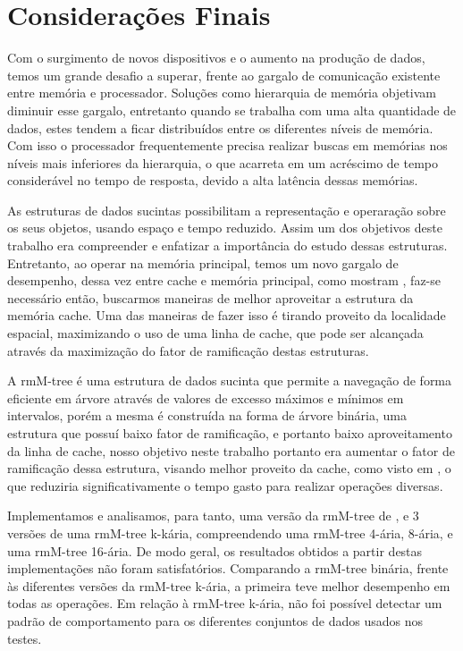 \chapter{Considerações Finais}\label{chp:conclusao}

Com o surgimento de novos dispositivos e o aumento na produção de dados, temos um grande desafio a superar, frente ao gargalo de comunicação existente entre memória e processador. Soluções como hierarquia de memória objetivam diminuir esse gargalo, entretanto quando se trabalha com uma alta quantidade de dados, estes tendem a ficar distribuídos entre os diferentes níveis de memória. Com isso o processador frequentemente precisa realizar buscas em memórias  nos níveis mais inferiores da hierarquia, o que acarreta em um acréscimo de tempo considerável no tempo de resposta, devido a alta latência dessas memórias.

As estruturas de dados sucintas possibilitam a representação e operaração sobre os seus objetos, usando espaço e tempo reduzido. Assim um dos objetivos deste trabalho era compreender e enfatizar a importância do estudo dessas estruturas. Entretanto, ao operar na memória principal, temos um novo gargalo de desempenho, dessa vez entre cache e memória principal, como mostram \citet{paper-making-btree-cache}, faz-se necessário então, buscarmos maneiras de melhor aproveitar a estrutura da memória cache. Uma das maneiras de fazer isso é tirando proveito da localidade espacial, maximizando o uso de uma linha de cache, que pode ser alcançada através da maximização do fator de ramificação destas estruturas. 

A rmM-tree é uma estrutura de dados sucinta que permite a navegação de forma eficiente em árvore através de valores de excesso máximos e mínimos em intervalos, porém a mesma é construída na forma de árvore binária, uma estrutura que possuí baixo fator de ramificação, e portanto baixo aproveitamento da linha de cache, nosso objetivo neste trabalho portanto era aumentar o fator de ramificação dessa estrutura, visando  melhor proveito da cache, como visto em \citep{paper-making-btree-cache}, o que reduziria significativamente o tempo gasto para realizar operações diversas. 

Implementamos e analisamos, para tanto, uma versão da rmM-tree de \citet{book-compact-data-structures}, e 3 versões de uma rmM-tree k-kária, compreendendo uma rmM-tree 4-ária, 8-ária, e uma rmM-tree 16-ária. De modo geral, os resultados obtidos a partir destas implementações não foram satisfatórios. Comparando a rmM-tree binária, frente às diferentes versões da rmM-tree k-ária, a primeira teve melhor desempenho em todas as operações. Em relação à rmM-tree k-ária, não foi possível detectar um padrão de comportamento para os diferentes conjuntos de dados usados nos testes. 

